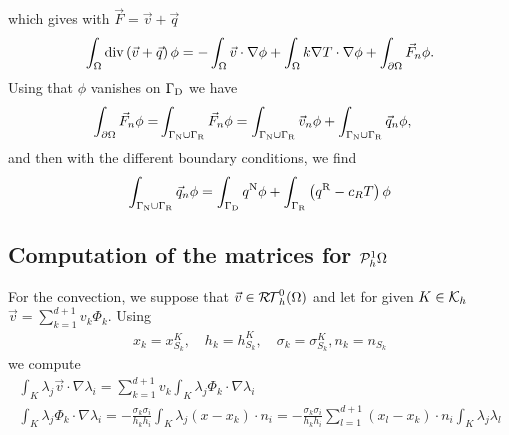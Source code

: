 %
which gives with $\vec{F}=\vec{v} + \vec{q}$%
\begin{align*}
\int_{\Omega} \operatorname{div}\left(\vec{v} + \vec{q}\right)\phi = -\int_{\Omega}\vec{v}\cdot\nabla\phi
+ \int_{\Omega}k\nabla T\cdot\nabla\phi+ \int_{\partial\Omega} \vec{F}_n\phi.
\end{align*}
%
Using that $\phi$ vanishes on $\Gamma_{\rm D}$ we have
%
\begin{align*}
\int_{\partial\Omega} \vec{F}_n\phi =& \int_{\Gamma_{\rm N}\cup\Gamma_{\rm R}} \vec{F}_n\phi
= \int_{\Gamma_{\rm N}\cup\Gamma_{\rm R}} \vec{v}_n\phi + \int_{\Gamma_{\rm N}\cup\Gamma_{\rm R}} \vec{q}_n\phi,
\end{align*}
%
and then with the different boundary conditions, we find
%
\begin{align*}
\int_{\Gamma_{\rm N}\cup\Gamma_{\rm R}} \vec{q}_n\phi = \int_{\Gamma_{\rm D}} q^{\rm N}\phi + \int_{\Gamma_{\rm R}}\left(q^{\rm R} - c_R T\right)\phi
\end{align*}
%
%
\subsection{Computation of the matrices for $\mathcal{P}_h^1{\Omega}$}\label{subsec:}
%
For the convection, we suppose that $\vec{v}\in \mathcal{R\!T}^0_h(\Omega)$ and let for given $K\in\mathcal K_h$ 
$\vec{v}=\sum_{k=1}^{d+1} v_k \Phi_k$. Using
%
\begin{align*}
x_k = x_{S_k}^K,\quad h_k = h_{S_k}^K, \quad \sigma_k = \sigma_{S_k}^K, n_k = n_{S_k}
\end{align*}
%
we compute
%
\begin{align*}
\int_K \lambda_j \vec{v}\cdot \nabla \lambda_i = \sum_{k=1}^{d+1} v_k \int_K \lambda_j \Phi_k\cdot \nabla \lambda_i\\
\int_K \lambda_j \Phi_k\cdot \nabla \lambda_i = -\frac{\sigma_k \sigma_i}{h_kh_i} \int_K  \lambda_j (x-x_k) \cdot n_i
= -\frac{\sigma_k \sigma_i}{h_kh_i} \sum_{l=1}^{d+1} (x_l-x_k) \cdot n_i \int_K  \lambda_j\lambda_l 
\end{align*}
%




\printbibliography[title=References Section~\thesection]




